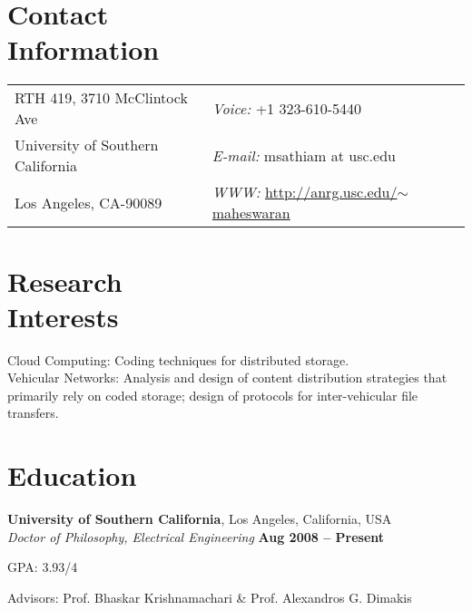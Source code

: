 \documentclass[margin,line]{resume}
\begin{document}
\begin{resume}


\section{\mysidestyle Contact\\Information}


\begin{tabular}{@{}p{3in}p{6in}}
RTH 419, 3710 McClintock Ave & {\it Voice:}  +1 323-610-5440 \\            
University of Southern California & {\it E-mail:}  msathiam at usc.edu\\
Los Angeles, CA-90089 & {\it WWW:} \href{http://anrg.usc.edu/~maheswaran}{http://anrg.usc.edu/$\sim$maheswaran} \\     
\end{tabular}

    \section{\mysidestyle Research\\Interests}
	Cloud Computing: Coding techniques for distributed storage. \\
	Vehicular Networks: Analysis and design of content distribution strategies that primarily rely on coded storage; design of protocols for inter-vehicular file transfers.


    \section{\mysidestyle Education}

    \textbf{University of Southern California}, Los Angeles, California, USA \\%
    \textsl{Doctor of Philosophy, Electrical Engineering} \hfill \textbf{ Aug 2008 -- Present}\vspace{-3mm}\\\vspace{-1mm}
    \begin{list2}
        \item GPA: 3.93/4
        \item Advisors:  Prof. Bhaskar Krishnamachari \& Prof. Alexandros G. Dimakis
    \end{list2}\vspace{-1.5mm}
    

\end{resume}
\end{document}
